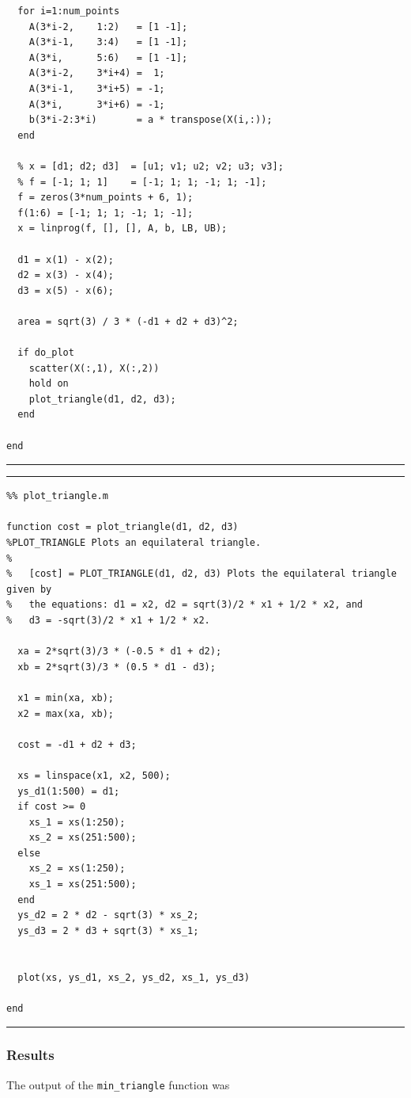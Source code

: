 \documentclass{article}
\begin{document}
\begin{lstlisting}
  for i=1:num_points
    A(3*i-2,    1:2)   = [1 -1];
    A(3*i-1,    3:4)   = [1 -1];
    A(3*i,      5:6)   = [1 -1];
    A(3*i-2,    3*i+4) =  1;
    A(3*i-1,    3*i+5) = -1;
    A(3*i,      3*i+6) = -1;
    b(3*i-2:3*i)       = a * transpose(X(i,:));
  end
  
  % x = [d1; d2; d3]  = [u1; v1; u2; v2; u3; v3];
  % f = [-1; 1; 1]    = [-1; 1; 1; -1; 1; -1];
  f = zeros(3*num_points + 6, 1);
  f(1:6) = [-1; 1; 1; -1; 1; -1];
  x = linprog(f, [], [], A, b, LB, UB);
  
  d1 = x(1) - x(2);
  d2 = x(3) - x(4);
  d3 = x(5) - x(6);
  
  area = sqrt(3) / 3 * (-d1 + d2 + d3)^2;
  
  if do_plot
    scatter(X(:,1), X(:,2))
    hold on
    plot_triangle(d1, d2, d3);
  end

end
\end{lstlisting}

\hrule
\vspace{0.25in}
\hrule
\begin{lstlisting}
%% plot_triangle.m

function cost = plot_triangle(d1, d2, d3)
%PLOT_TRIANGLE Plots an equilateral triangle.
%
%   [cost] = PLOT_TRIANGLE(d1, d2, d3) Plots the equilateral triangle given by
%   the equations: d1 = x2, d2 = sqrt(3)/2 * x1 + 1/2 * x2, and
%   d3 = -sqrt(3)/2 * x1 + 1/2 * x2.
  
  xa = 2*sqrt(3)/3 * (-0.5 * d1 + d2);
  xb = 2*sqrt(3)/3 * (0.5 * d1 - d3);
  
  x1 = min(xa, xb);
  x2 = max(xa, xb);
  
  cost = -d1 + d2 + d3;
  
  xs = linspace(x1, x2, 500);
  ys_d1(1:500) = d1;
  if cost >= 0
    xs_1 = xs(1:250);
    xs_2 = xs(251:500);
  else
    xs_2 = xs(1:250);
    xs_1 = xs(251:500);
  end
  ys_d2 = 2 * d2 - sqrt(3) * xs_2;
  ys_d3 = 2 * d3 + sqrt(3) * xs_1;
  
  
  plot(xs, ys_d1, xs_2, ys_d2, xs_1, ys_d3)

end
\end{lstlisting}
\hrule
\vspace{0.25in}

\subsubsection{Results}

The output of the \texttt{min\_triangle} function was
\end{document}

